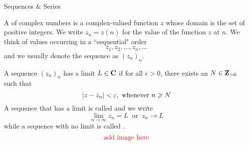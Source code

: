 \vspace*{1em}

\begin{mdframed}
\begin{center}
{\Large Sequences \& Series}
\end{center}
\end{mdframed}

\begin{definition}[Sequences]
A  of complex numbers is a complex-valued function $z$ whose domain is the set of positive integers. We write $z_n = z(n)$ for the value of the function $z$ at $n$. We think of values occurring in a ``sequential" order
\[z_1,z_2,\ldots,z_n,\ldots\] 
and we usually denote the sequence as $(z_n)_n$.
\end{definition}

\vspace*{1em}

\begin{definition}
A sequence $(z_n)_n$ has a limit $L \in \mathbf C$ if for all $\epsilon > 0$, there exists an $N \in \mathbf Z_{>0}$ such that 
\[\abs{z - z_n} < \epsilon,\ \text{whenever } n \geq N\]
A sequence that has a limit is called  and we write
\[\lim_{n \to \infty} z_n = L \ \text{ or }\ z_n \to L\]
while a sequence with no limit is called .
\[\text{\color{red}add image here}\]
\end{definition}

\vspace*{1em}

